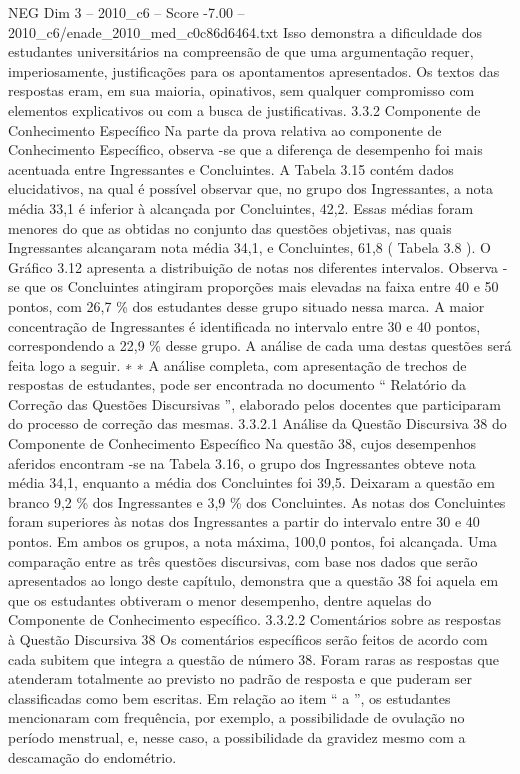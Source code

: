 \begin{textsample}{NEG Dim 3 – 2010\_c6 – Score -7.00 – 2010\_c6/enade\_2010\_med\_c0c86d6464.txt}
Isso demonstra a dificuldade dos estudantes universitários na compreensão de que uma argumentação requer, imperiosamente, justificações para os apontamentos apresentados.
Os textos das respostas eram, em sua maioria, opinativos, sem qualquer compromisso com elementos explicativos ou com a busca de justificativas. 3.3.2 Componente de Conhecimento Específico Na parte da prova relativa ao componente de Conhecimento Específico, observa -se que a diferença de desempenho foi mais acentuada entre Ingressantes e Concluintes.
A Tabela 3.15 contém dados elucidativos, na qual é possível observar que, no grupo dos Ingressantes, a nota média 33,1 é inferior à alcançada por Concluintes, 42,2.
Essas médias foram menores do que as obtidas no conjunto das questões objetivas, nas quais Ingressantes alcançaram nota média 34,1, e Concluintes, 61,8 ( Tabela 3.8 ).
O Gráfico 3.12 apresenta a distribuição de notas nos diferentes intervalos.
Observa -se que os Concluintes atingiram proporções mais elevadas na faixa entre 40 e 50 pontos, com 26,7 \% dos estudantes desse grupo situado nessa marca.
A maior concentração de Ingressantes é identificada no intervalo entre 30 e 40 pontos, correspondendo a 22,9 \% desse grupo.
A análise de cada uma destas questões será feita logo a seguir. ∗ ∗ A análise completa, com apresentação de trechos de respostas de estudantes, pode ser encontrada no documento “ Relatório da Correção das Questões Discursivas ”, elaborado pelos docentes que participaram do processo de correção das mesmas. 3.3.2.1 Análise da Questão Discursiva 38 do Componente de Conhecimento Específico Na questão 38, cujos desempenhos aferidos encontram -se na Tabela 3.16, o grupo dos Ingressantes obteve nota média 34,1, enquanto a média dos Concluintes foi 39,5.
Deixaram a questão em branco 9,2 \% dos Ingressantes e 3,9 \% dos Concluintes.
As notas dos Concluintes foram superiores às notas dos Ingressantes a partir do intervalo entre 30 e 40 pontos.
Em ambos os grupos, a nota máxima, 100,0 pontos, foi alcançada.
Uma comparação entre as três questões discursivas, com base nos dados que serão apresentados ao longo deste capítulo, demonstra que a questão 38 foi aquela em que os estudantes obtiveram o menor desempenho, dentre aquelas do Componente de Conhecimento específico. 3.3.2.2 Comentários sobre as respostas à Questão Discursiva 38 Os comentários específicos serão feitos de acordo com cada subitem que integra a questão de número 38.
Foram raras as respostas que atenderam totalmente ao previsto no padrão de resposta e que puderam ser classificadas como bem escritas.
Em relação ao item “ a ”, os estudantes mencionaram com frequência, por exemplo, a possibilidade de ovulação no período menstrual, e, nesse caso, a possibilidade da gravidez mesmo com a descamação do endométrio.

\end{textsample}
